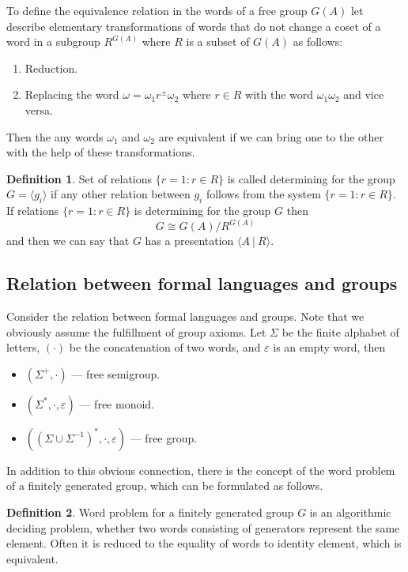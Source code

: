 \documentclass[conference]{IEEEtran}
\theoremstyle{definition}
\newtheorem{defn}{Definition}[section]
\begin{document}
To define the equivalence relation in the words of a free group $G(A)$
let describe elementary transformations of words that do not change
a coset of a word in a subgroup $R^{G(A)}$ where $R$ is a subset of $G(A)$ as follows:
\begin{enumerate}
\item Reduction.
\item Replacing the word $\omega = \omega_1 r^{\pm} \omega_2$ where $r \in R$ with the word $\omega_1 \omega_2$ and vice versa.
\end{enumerate}
Then the any words $\omega_1$ and $\omega_2$ are equivalent if we can bring one to
the other with the help of these transformations.

\begin{defn}
Set of relations $\{ r=1: r \in R \}$ is called determining for the group
$G= \langle g_i \rangle$ if any other relation between
$g_i$ follows from the system $\{ r=1 : r \in R \}$. If relations
$\{ r=1 : r \in R \}$ is determining for the group 
$G$ then $$G \cong G(A)/R^{G(A)}$$
and then we can say that $G$ has a presentation $\langle A ~|~ R \rangle$.
\end{defn}

\subsection{Relation between formal languages and groups}
Consider the relation between formal languages and groups.
Note that we obviously assume the fulfillment of group axioms.
Let $ \Sigma $ be the finite alphabet of letters, $ (\cdot) $ be the concatenation of two words, and $ \varepsilon $ is an empty word, then
\begin{itemize}
    \item $(\Sigma^+, \cdot)$ --- free semigroup.
    \item $(\Sigma^*, \cdot, \varepsilon)$ --- free monoid.
    \item $((\Sigma \cup \Sigma^{-1})^*, \cdot, \varepsilon)$ --- free group.
\end{itemize}

In addition to this obvious connection, there is the concept of the word problem of a finitely generated group, which can be formulated as follows.

\begin{defn}
Word problem for a finitely generated group  $G$ is an algorithmic deciding problem,
whether two words consisting of generators represent the same element.
Often it is reduced to the equality of words to identity element, which is equivalent.
\end{defn}
\end{document}
